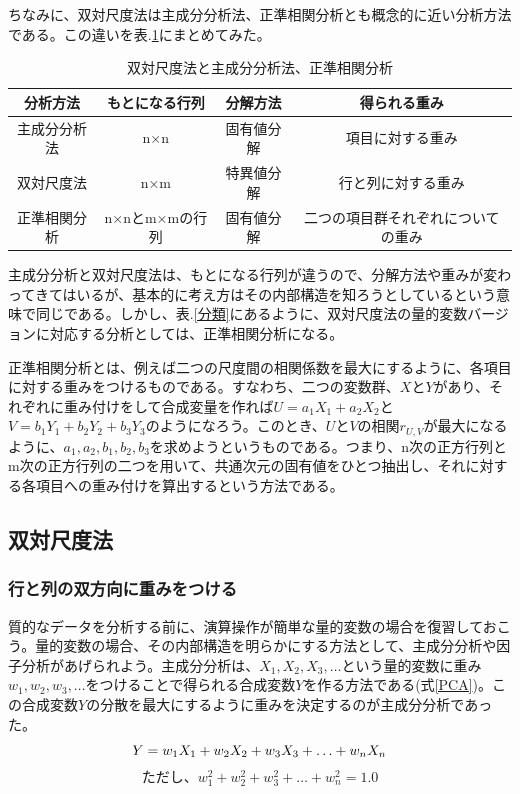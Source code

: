 \documentclass{ltjsbook}
\begin{document}
ちなみに、双対尺度法は主成分分析法、正準相関分析とも概念的に近い分析方法である。この違いを表.\ref{sf}にまとめてみた。
\begin{table}[h]
    \begin{center}
        \caption{双対尺度法と主成分分析法、正準相関分析}
        \begin{tabular}{c|ccc}
            分析方法   & もとになる行列    & 分解方法  & 得られる重み            \\
            \hline
            主成分分析法 & n×n        & 固有値分解 & 項目に対する重み          \\
            双対尺度法  & n×m        & 特異値分解 & 行と列に対する重み         \\
            正準相関分析 & n×nとm×mの行列 & 固有値分解 & 二つの項目群それぞれについての重み \\
        \end{tabular}
        \label{sf}
    \end{center}
\end{table}

主成分分析と双対尺度法は、もとになる行列が違うので、分解方法や重みが変わってきてはいるが、基本的に考え方はその内部構造を知ろうとしているという意味で同じである。しかし、表.\ref{分類}にあるように、双対尺度法の量的変数バージョンに対応する分析としては、正準相関分析になる。

正準相関分析とは、例えば二つの尺度間の相関係数を最大にするように、各項目に対する重みをつけるものである。すなわち、二つの変数群、$X$と$Y$があり、それぞれに重み付けをして合成変量を作れば$U=a_{1}X_{1}+a_{2}X_{2}$と$V=b_{1}Y_{1}+b_{2}Y_{2}+b_{3}Y_{3}$のようになろう。このとき、$U$と$V$の相関$r_{U,V}$が最大になるように、$a_{1},a_{2},b_{1},b_{2},b_{3}$を求めようというものである。つまり、n次の正方行列とm次の正方行列の二つを用いて、共通次元の固有値をひとつ抽出し、それに対する各項目への重み付けを算出するという方法である。
\subsection{双対尺度法}
\subsubsection{行と列の双方向に重みをつける}
質的なデータを分析する前に、演算操作が簡単な量的変数の場合を復習しておこう。量的変数の場合、その内部構造を明らかにする方法として、主成分分析や因子分析があげられよう。主成分分析は、$X_{1},X_{2},X_{3},\ldots $という量的変数に重み$w_{1},w_{2},w_{3},\ldots $をつけることで得られる合成変数$Y$を作る方法である(式\ref{PCA})。この合成変数$Y$の分散を最大にするように重みを決定するのが主成分分析であった。
\begin{equation}
    \label{PCA}
    Y=w_{1}X_{1}+w_{2}X_{2}+w_{3}X_{3}+\ldots +w_{n}X_{n}\\
\end{equation}
$$ただし、w_{1}^{2}+w_{2}^{2}+w_{3}^{2}+\ldots+w_{n}^{2}=1.0$$
\end{document}
